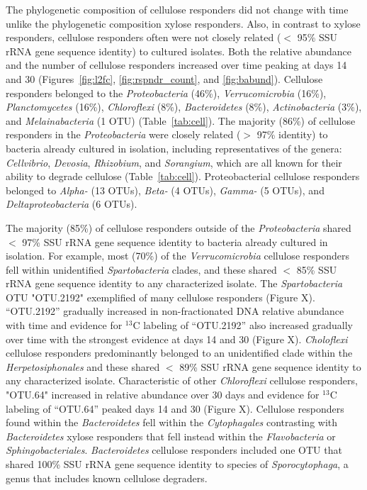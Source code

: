 The phylogenetic composition of cellulose responders did not change with
time unlike the phylogenetic composition xylose responders. Also, in
contrast to xylose responders, cellulose responders often were not closely
related ($<$ 95\% SSU rRNA gene sequence identity) to cultured isolates.
Both the relative abundance and the number of cellulose responders
increased over time peaking at days 14 and 30 (Figures~\ref{fig:l2fc},
\ref{fig:rspndr_count}, and \ref{fig:babund}). Cellulose responders belonged to the
\textit{Proteobacteria} (46\%), \textit{Verrucomicrobia} (16\%),
\textit{Planctomycetes} (16\%), \textit{Chloroflexi} (8\%),
\textit{Bacteroidetes} (8\%), \textit{Actinobacteria} (3\%), and
\textit{Melainabacteria} (1 OTU) (Table~\ref{tab:cell}). The majority (86\%)
of cellulose responders in the \textit{Proteobacteria} were closely related
($>$ 97\% identity) to bacteria already cultured in isolation, including
representatives of the genera: \textit{Cellvibrio}, \textit{Devosia},
\textit{Rhizobium}, and \textit{Sorangium}, which are all known for their
ability to degrade cellulose (Table~\ref{tab:cell}). Proteobacterial cellulose
responders belonged to \textit{Alpha-} (13 OTUs), \textit{Beta-} (4 OTUs),
\textit{Gamma-} (5 OTUs), and \textit{Deltaproteobacteria} (6 OTUs). 

The majority (85\%) of cellulose responders outside of the
\textit{Proteobacteria} shared  $<$ 97\% SSU rRNA gene sequence identity to
bacteria already cultured in isolation. For example, most (70\%) of the
\textit{Verrucomicrobia} cellulose responders fell within unidentified
\textit{Spartobacteria} clades, and these shared $<$ 85\% SSU rRNA gene
sequence identity to any characterized isolate. The \textit{Spartobacteria} OTU
"OTU.2192" exemplified of many cellulose responders (Figure X). ``OTU.2192''
gradually increased in non-fractionated DNA relative abundance with time
and evidence for $^{13}$C labeling of ``OTU.2192'' also increased
gradually over time with the strongest evidence at days 14 and
30 (Figure X). \textit{Choloflexi} cellulose responders predominantly belonged
to an unidentified clade within the \textit{Herpetosiphonales} and these
shared $<$ 89\% SSU rRNA gene sequence identity to any characterized
isolate. Characteristic of other \textit{Chloroflexi} cellulose responders,
"OTU.64" increased in relative abundance over 30 days and evidence for
$^{13}$C labeling of ``OTU.64'' peaked days 14 and 30 (Figure X).
Cellulose responders found within the \textit{Bacteroidetes} fell within
the \textit{Cytophagales} contrasting with \textit{Bacteroidetes} xylose
responders that fell instead within the \textit{Flavobacteria} or
\textit{Sphingobacteriales}. \textit{Bacteroidetes} cellulose responders
included one OTU that shared 100\% SSU rRNA gene sequence identity to
species of \textit{Sporocytophaga}, a genus that includes known cellulose
degraders.

